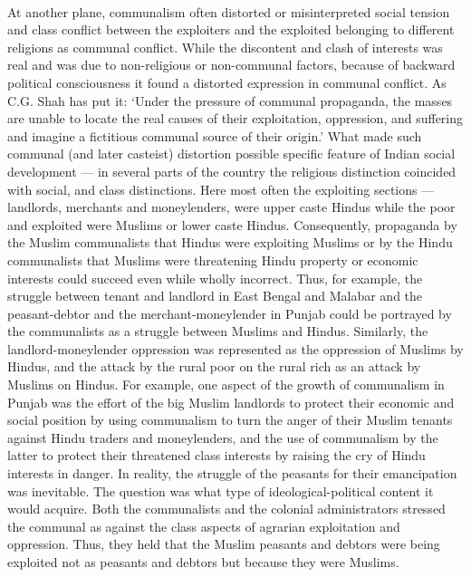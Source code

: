 \begin{multicols}{2}
\paragraph*{}
At another plane, communalism often distorted or misinterpreted social tension and class conflict between the exploiters and the exploited belonging to different religions as communal conflict. While the discontent and clash of interests was real and was due to non-religious or non-communal factors, because of backward political consciousness it found a distorted expression in communal conflict. As C.G. Shah has put it: `Under the pressure of communal propaganda, the masses are unable to locate the real causes of their exploitation, oppression, and suffering and imagine a fictitious communal source of their origin.' What made such communal (and later casteist) distortion possible specific feature of Indian social development --- in several parts of the country the religious distinction coincided with social, and class distinctions. Here most often the exploiting sections --- landlords, merchants and moneylenders, were upper caste Hindus while the poor and exploited were Muslims or lower caste Hindus. Consequently, propaganda by the Muslim communalists that Hindus were exploiting Muslims or by the Hindu communalists that Muslims were threatening Hindu property or economic interests could succeed even while wholly incorrect. Thus, for example, the struggle between tenant and landlord in East Bengal and Malabar and the peasant-debtor and the merchant-moneylender in Punjab could be portrayed by the communalists as a struggle between Muslims and Hindus. Similarly, the landlord-moneylender oppression was represented as the oppression of Muslims by Hindus, and the attack by the rural poor on the rural rich as an attack by Muslims on Hindus. For example, one aspect of the growth of communalism in Punjab was the effort of the big Muslim landlords to protect their economic and social position by using communalism to turn the anger of their Muslim tenants against Hindu traders and moneylenders, and the use of communalism by the latter to protect their threatened class interests by raising the cry of Hindu interests in danger. In reality, the struggle of the peasants for their emancipation was inevitable. The question was what type of ideological-political content it would acquire. Both the communalists and the colonial administrators stressed the communal as against the class aspects of agrarian exploitation and oppression. Thus, they held that the Muslim peasants and debtors were being exploited not as peasants and debtors but because they were Muslims.


\end{multicols}
